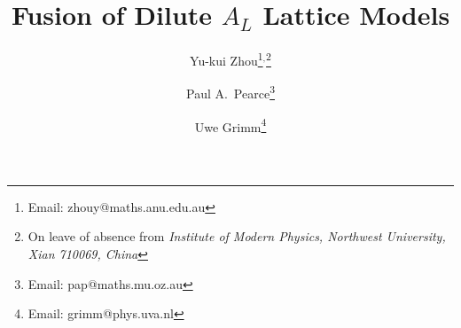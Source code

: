 \def\mndim#1#2#3#4#5{\setlength{\unitlength}{0.0115in}
\rule[-11mm]{0mm}{24mm}
\begin{picture}(42,45)(21,46)
\thicklines
\put(35,80){\line(-1,-2){15}}
\put(20,50){\line( 1,-2){15}}
\put(35,20){\line( 1, 2){15}}
\put(50,50){\line(-1, 2){15}}
\put(45,65){\sc $#1$}
\put(23,47){\sc $(\!n,\!m\!)$}
\put(45,28){\sc $#2$}
\put(18,28){\sc $\rho$}
\put(18,65){\sc $\gamma$}
\put(53,47){\sc $#5$}
\put(11,47){\sc $d$}
\put(32,83){\sc $#3$}
\put(32,10){\sc $#4$}
\end{picture}}

\def\nmfusion{
\setlength{\unitlength}{0.0125in}
\begin{picture}(210,111)(0,0)
\thicklines
\put( 20, 60){\line( 0, 1){45}}
\put( 20, 60){\line( 1, 0){210}}
\put(110, 60){\line( 0, 1){45}}
\put( 20,105){\line( 1, 0){210}}
\put(230, 60){\line( 0, 1){45}}
\put(110, 60){\line(-3,-1){90}}
\put(110, 60){\line( 4,-1){120}}
\put( 20, 30){\line( 4,-1){120}}
\put(230, 30){\line(-3,-1){90}}
\put(110, 60){\circle*{6}}
\put( 47, 80){\sc $W_{(n,0)}(u)$}
\put(123, 80){\sc $W_{(m,0)}(u+(2n+1)\la)$}
\put( 80, 26){\sc $W^{(m,0)}_{(n,0)}(-(2n+1)\la)$}
\put( 10, 54){$a$}
\put( 10,105){$d$}
\put(233,105){$c$}
\put(233, 54){$b$}
\put( 11, 27){$a$}
\put(233, 27){$b$}
\put( 65, 39){\sc $\alpha$}
\put( 60, 53){\sc $\alpha$}
\put(153, 40){\sc $\beta$}
\put(170, 53){\sc $\beta$}
\put(107, 48){\sc $c'$}
\end{picture}}



\vspace{0.5cm}
\begin{center}
\title{Fusion of Dilute $A_L$ Lattice Models}

\author{Yu-kui Zhou\footnote{Email: zhouy@maths.anu.edu.au}$^,$\footnote{
       On leave of absence from {\sl Institute of Modern Physics,
                      Northwest University, Xian 710069, China}}}

\address{Mathematics Department, The Australian National University,\\
          Canberra, ACT 0200, Australia   }

\author{Paul A.\ Pearce\footnote{Email: pap@maths.mu.oz.au}}

\address{Mathematics Department, University of Melbourne,\\
          Parkville, Victoria 3052, Australia  }

\author{Uwe Grimm\footnote{Email: grimm@phys.uva.nl}}

\address{Instituut voor Theoretische Fysica, Universiteit van Amsterdam,\\
         Valckenierstraat 65, 1018 XE Amsterdam, The Netherlands}
\end{center}

